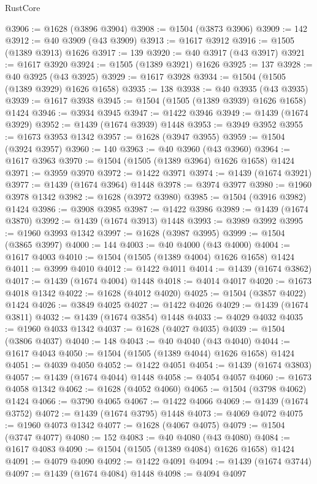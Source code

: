 \begin{lexlean}{RustCore}
\begin{coremodule}
@3906 := @1628 (@3896 @3904)
@3908 := @1504 (@3873 @3906)
@3909 := 142
@3912 := @40 @3909 (@43 @3909)
@3913 := @1617 @3912
@3916 := @1505 (@1389 @3913) @1626
@3917 := 139
@3920 := @40 @3917 (@43 @3917)
@3921 := @1617 @3920
@3924 := @1505 (@1389 @3921) @1626
@3925 := 137
@3928 := @40 @3925 (@43 @3925)
@3929 := @1617 @3928
@3934 := @1504 (@1505 (@1389 @3929) @1626 @1658)
@3935 := 138
@3938 := @40 @3935 (@43 @3935)
@3939 := @1617 @3938
@3945 := @1504 (@1505 (@1389 @3939) @1626 @1658) @1424
@3946 := @3934 @3945
@3947 := @1422 @3946
@3949 := @1439 (@1674 @3929)
@3952 := @1439 (@1674 @3939) @1448
@3953 := @3949 @3952
@3955 := @1673 @3953 @1342
@3957 := @1628 (@3947 @3955)
@3959 := @1504 (@3924 @3957)
@3960 := 140
@3963 := @40 @3960 (@43 @3960)
@3964 := @1617 @3963
@3970 := @1504 (@1505 (@1389 @3964) @1626 @1658) @1424
@3971 := @3959 @3970
@3972 := @1422 @3971
@3974 := @1439 (@1674 @3921)
@3977 := @1439 (@1674 @3964) @1448
@3978 := @3974 @3977
@3980 := @1960 @3978 @1342
@3982 := @1628 (@3972 @3980)
@3985 := @1504 (@3916 @3982) @1424
@3986 := @3908 @3985
@3987 := @1422 @3986
@3989 := @1439 (@1674 @3870)
@3992 := @1439 (@1674 @3913) @1448
@3993 := @3989 @3992
@3995 := @1960 @3993 @1342
@3997 := @1628 (@3987 @3995)
@3999 := @1504 (@3865 @3997)
@4000 := 144
@4003 := @40 @4000 (@43 @4000)
@4004 := @1617 @4003
@4010 := @1504 (@1505 (@1389 @4004) @1626 @1658) @1424
@4011 := @3999 @4010
@4012 := @1422 @4011
@4014 := @1439 (@1674 @3862)
@4017 := @1439 (@1674 @4004) @1448
@4018 := @4014 @4017
@4020 := @1673 @4018 @1342
@4022 := @1628 (@4012 @4020)
@4025 := @1504 (@3857 @4022) @1424
@4026 := @3849 @4025
@4027 := @1422 @4026
@4029 := @1439 (@1674 @3811)
@4032 := @1439 (@1674 @3854) @1448
@4033 := @4029 @4032
@4035 := @1960 @4033 @1342
@4037 := @1628 (@4027 @4035)
@4039 := @1504 (@3806 @4037)
@4040 := 148
@4043 := @40 @4040 (@43 @4040)
@4044 := @1617 @4043
@4050 := @1504 (@1505 (@1389 @4044) @1626 @1658) @1424
@4051 := @4039 @4050
@4052 := @1422 @4051
@4054 := @1439 (@1674 @3803)
@4057 := @1439 (@1674 @4044) @1448
@4058 := @4054 @4057
@4060 := @1673 @4058 @1342
@4062 := @1628 (@4052 @4060)
@4065 := @1504 (@3798 @4062) @1424
@4066 := @3790 @4065
@4067 := @1422 @4066
@4069 := @1439 (@1674 @3752)
@4072 := @1439 (@1674 @3795) @1448
@4073 := @4069 @4072
@4075 := @1960 @4073 @1342
@4077 := @1628 (@4067 @4075)
@4079 := @1504 (@3747 @4077)
@4080 := 152
@4083 := @40 @4080 (@43 @4080)
@4084 := @1617 @4083
@4090 := @1504 (@1505 (@1389 @4084) @1626 @1658) @1424
@4091 := @4079 @4090
@4092 := @1422 @4091
@4094 := @1439 (@1674 @3744)
@4097 := @1439 (@1674 @4084) @1448
@4098 := @4094 @4097

\end{coremodule}
\end{lexlean}
